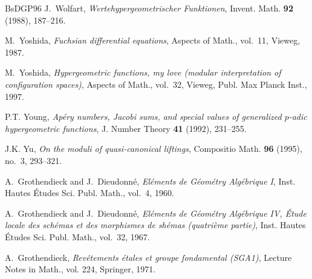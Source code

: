 \begin{thebibliography}{BsDGP96}
J.~Wolfart, \emph{Wertehypergeometrischer Funktionen}, Invent. Math.
  \textbf{92} (1988), 187--216.

M.~Yoshida, \emph{Fuchsian differential equations}, Aspects of Math., vol.~11,
  Vieweg, 1987.

M.~Yoshida, \emph{Hypergeometric functions, my love (modular interpretation of
  configuration spaces)}, Aspects of Math., vol.~32, Vieweg, Publ. Max Planck
  Inst., 1997.

P.T. Young, \emph{Ap\'ery numbers, {J}acobi sums, and special values of
  generalized $p$-adic hypergeometric functions}, J. Number Theory \textbf{41}
  (1992), 231--255.

J.K. Yu, \emph{On the moduli of quasi-canonical liftings}, Compositio Math.
  \textbf{96} (1995), no.~3, 293--321.

A.~Grothendieck and J.~Dieudonn\'e, \emph{El\'ements de {G}\'eom\'etry
  {A}lg\'ebrique {I}}, Inst. Hautes {\'E}tudes Sci. Publ. Math., vol.~4, 1960.

A.~Grothendieck and J.~Dieudonn\'e, \emph{El\'ements de {G}\'eom\'etry
  {A}lg\'ebrique {I}{V}, \'{E}tude locale des sch\'emas et des morphismes de
  sh\'emas (quatri\`eme partie)}, Inst. Hautes {\'E}tudes Sci. Publ. Math.,
  vol.~32, 1967.

A.~Grothendieck, \emph{Rev\^etements \'etales et groupe fondamental
  ({S}{G}{A}1)}, Lecture Notes in Math., vol. 224, Springer, 1971.

\end{thebibliography}
